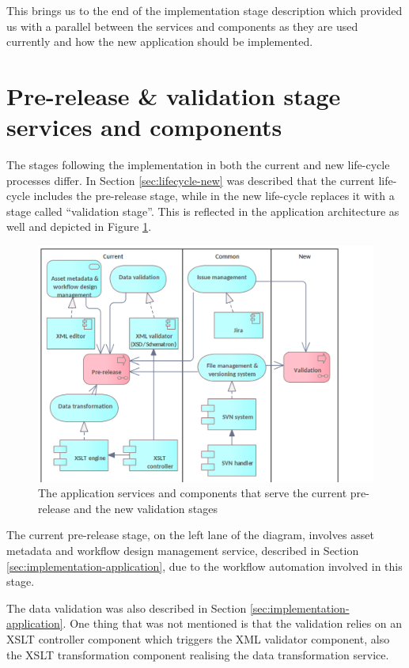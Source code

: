 	This brings us to the end of the implementation stage description which provided us with a parallel between the services and components as they are used currently and how the new application should be implemented. 
	
	\section{Pre-release \& validation stage services and components}
	\label{sec:validation-application}
	
	The stages following the implementation in both the current and new life-cycle processes differ. In Section \ref{sec:lifecycle-new} was described that the current life-cycle includes the pre-release stage, while in the new life-cycle replaces it with a stage called ``validation stage''. This is reflected in the application architecture as well and depicted in Figure \ref{fig:application-validation}.
	
	\begin{figure}[h]
		\centering
		\includegraphics[width=.9\textwidth]{images/application/Validation & Pre-release v3.png}
		\caption{The application services and components that serve the current pre-release and the new validation stages}
		\label{fig:application-validation}
	\end{figure}
	
	The current pre-release stage, on the left lane of the diagram, involves asset metadata and workflow design management service, described in Section \ref{sec:implementation-application}, due to the workflow automation involved in this stage. 
	
	The data validation was also described in Section \ref{sec:implementation-application}. One thing that was not mentioned is that the validation relies on an XSLT \citep{xslt3-Kay} controller component which triggers the XML validator component, also the XSLT transformation component realising the data transformation service.
	
